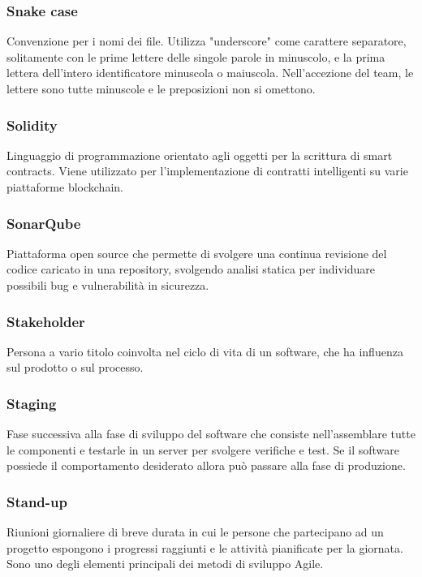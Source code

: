 \subsubsection*{Snake case}
Convenzione per i nomi dei file. Utilizza "underscore" come carattere separatore, solitamente con le prime lettere delle singole parole in minuscolo, e la prima lettera dell'intero identificatore minuscola o maiuscola.
Nell'accezione del team, le lettere sono tutte minuscole e le preposizioni non si omettono.

\subsubsection*{Solidity}
Linguaggio di programmazione orientato agli oggetti per la scrittura di smart contracts\glosp. Viene utilizzato per l'implementazione di contratti intelligenti su varie piattaforme blockchain\glo.

\subsubsection*{SonarQube}
Piattaforma open source che permette di svolgere una continua revisione del codice caricato in una repository, svolgendo analisi statica per individuare possibili bug e vulnerabilità in sicurezza.

\subsubsection*{Stakeholder}
Persona a vario titolo coinvolta nel ciclo di vita di un software, che ha influenza sul prodotto o sul processo.

\subsubsection*{Staging}
Fase successiva alla fase di sviluppo del software che consiste nell'assemblare tutte le componenti e testarle in un server per svolgere verifiche e test. Se il software possiede il comportamento desiderato allora può passare alla fase di produzione.

\subsubsection*{Stand-up}
Riunioni giornaliere di breve durata in cui le persone che partecipano ad un progetto espongono i progressi raggiunti e le attività pianificate per la giornata. Sono uno degli elementi principali dei metodi di sviluppo Agile\glo. 

